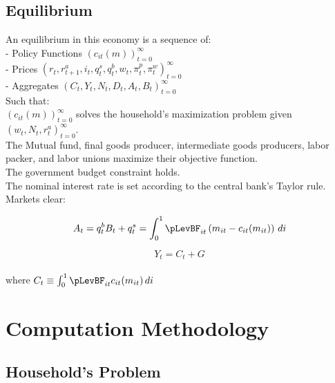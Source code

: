 \documentclass[titlepage]{\econtex}\providecommand{\texname}{BufferStockTheory}
\begin{document}
\hypertarget{Equilibrium}{}
\subsection{Equilibrium}


An equilibrium in this economy is a sequence of: \\

- Policy Functions $\left( c_{it}(m) \right )_{t=0}^{\infty}$ \\

- Prices $ \left(r_{t},  r^{a}_{t+1}, i_{t}, q^{s}_{t}, q^{b}_{t}, w_{t} , \pi^{p}_{t}, \pi^{w}_{t} \right) _{t=0}^{\infty}$\\

- Aggregates $ \left(C_{t}, Y_{t} , N_{t}, D_{t} , A_{t} , B_{t} \right)_{t=0}^{\infty}$\\

Such that: \\

$ \left(  c_{it}(m)\right)_{t=0}^{\infty}$  solves the household's maximization problem given $  \left( w_{t}, N_{t},  r^{a}_{t} \right)_{t=0}^{\infty}$.\\

The Mutual fund, final goods producer, intermediate goods producers, labor packer, and labor unions maximize their objective function. \\

The government budget constraint holds. \\

The nominal interest rate is set according to the central bank's Taylor rule. \\


Markets clear:

 $$ A_t = q^{b}_{t} B_{t} + q^{s}_{t} =  \int_{0}^{1} \pLevBF_{it}\left( m_{it} - c_{it}(m_{it})\right) \, di $$
 
 $$ Y_t = C_{t} +G $$ \\
 
 where $C_{t} \equiv  \int_{0}^{1} \pLevBF_{it} c_{it}(m_{it})\, di $ \\


\hypertarget{Computational Methodology}{}
\section{Computation Methodology}

\hypertarget{Household's Problem}{}
\subsection{Household's Problem}
\end{document}
